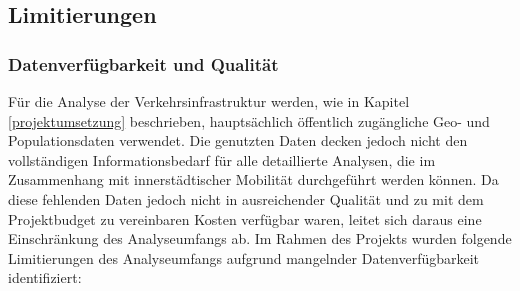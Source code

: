 


\subsection{Limitierungen}\label{limitierung}
\subsubsection{Datenverfügbarkeit und Qualität}
Für die Analyse der Verkehrsinfrastruktur werden, wie in Kapitel \ref{projektumsetzung} beschrieben, hauptsächlich öffentlich zugängliche Geo- und Populationsdaten verwendet. Die genutzten Daten decken jedoch nicht den vollständigen Informationsbedarf für alle detaillierte Analysen, die im Zusammenhang mit innerstädtischer Mobilität durchgeführt werden können. Da diese fehlenden Daten jedoch nicht in ausreichender Qualität und zu mit dem Projektbudget zu vereinbaren Kosten verfügbar waren, leitet sich daraus eine Einschränkung des Analyseumfangs ab. Im Rahmen des Projekts wurden folgende Limitierungen des Analyseumfangs aufgrund mangelnder Datenverfügbarkeit identifiziert:

